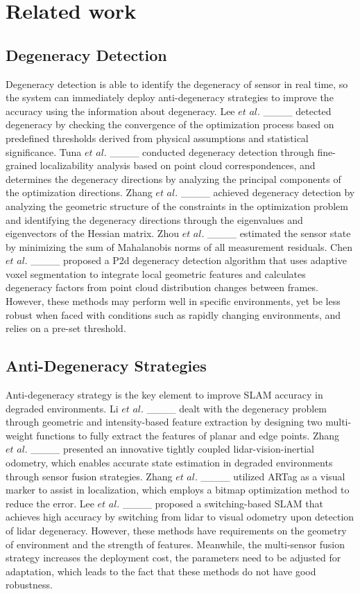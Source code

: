 \section{Related work}
\subsection{Degeneracy Detection}


Degeneracy detection is able to identify the degeneracy of sensor in real time, so the system can immediately deploy anti-degeneracy strategies to improve the accuracy using the information about degeneracy.
Lee $\textit{et al.}$ ____ detected degeneracy by checking the convergence of the optimization process based on predefined thresholds derived from physical assumptions and statistical significance. Tuna $\textit{et al.}$ ____ conducted degeneracy detection through fine-grained localizability analysis based on point cloud correspondences, and determines the degeneracy directions by analyzing the principal components of the optimization directions. Zhang $\textit{et al.}$ ____ achieved degeneracy detection by analyzing the geometric structure of the constraints in the optimization problem and identifying the degeneracy directions through the eigenvalues and eigenvectors of the Hessian matrix. Zhou $\textit{et al.}$ ____  estimated the sensor state by minimizing the sum of Mahalanobis norms of all measurement residuals. Chen $\textit{et al.}$ ____ proposed a P2d degeneracy detection algorithm that uses adaptive voxel segmentation to integrate local geometric features and calculates degeneracy factors from point cloud distribution changes between frames. However, these methods may perform well in specific environments, yet be less robust when faced with conditions such as rapidly changing environments, and relies on a pre-set threshold.

\subsection{Anti-Degeneracy Strategies}


Anti-degeneracy strategy is the key element to improve SLAM accuracy in degraded environments.
Li $\textit{et al.}$ ____ dealt with the degeneracy problem through geometric and intensity-based feature extraction by designing two multi-weight functions to fully extract the features of planar and edge points. Zhang $\textit{et al.}$ ____ presented an innovative tightly coupled lidar-vision-inertial odometry, which enables accurate state estimation in degraded environments through sensor fusion strategies. Zhang $\textit{et al.}$ ____ utilized ARTag as a visual marker to assist in localization, which employs a bitmap optimization method to reduce the error. Lee $\textit{et al.}$ ____ proposed a switching-based SLAM that achieves high accuracy by switching from lidar to visual odometry upon detection of lidar degeneracy. 
However, these methods have requirements on the geometry of environment and the strength of features. Meanwhile, the multi-sensor fusion strategy increases the deployment cost, the parameters need to be adjusted for adaptation, which leads to the fact that these methods do not have good robustness.